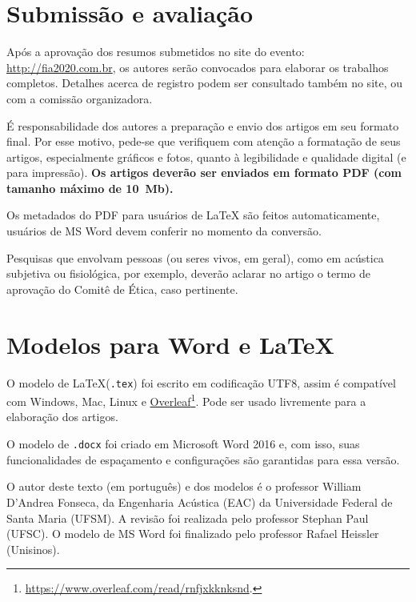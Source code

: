 \documentclass[12pt, a4paper, twoside, twocolumn]{article}
\begin{document}
\section{Submissão e avaliação}

Após a aprovação dos resumos submetidos no site do evento: \url{http://fia2020.com.br}, os autores serão convocados para elaborar os trabalhos completos.
Detalhes acerca de registro podem ser consultado também no site, ou com a comissão organizadora.

É responsabilidade dos autores a preparação e envio dos artigos em seu formato final. Por esse motivo, pede-se que verifiquem com atenção a formatação de seus artigos, especialmente gráficos e fotos, quanto à legibilidade e qualidade digital (e para impressão). \textbf{Os artigos deverão ser enviados em formato PDF (com tamanho máximo de 10~Mb).} 

Os metadados do PDF para usuários de \LaTeX\xspace são feitos automaticamente, usuários de MS Word devem conferir no momento da conversão.


Pesquisas que envolvam pessoas (ou seres vivos, em geral), como em acústica subjetiva ou fisiológica, por exemplo, deverão aclarar no artigo o termo de aprovação do Comitê de Ética, caso pertinente.

\section{Modelos para Word e \LaTeX}

O modelo de \LaTeX\xspace (\texttt{.tex}) foi escrito em codificação UTF8, assim é compatível com Windows, Mac, Linux e \href{https://www.overleaf.com/read/rnfjxkknksnd}{Overleaf}\footnote{\url{https://www.overleaf.com/read/rnfjxkknksnd}.}. Pode ser usado livremente para a elaboração dos artigos.

O modelo de \texttt{.docx} foi criado em Microsoft Word 2016 e, com isso, suas funcionalidades de espaçamento e configurações são garantidas para essa versão.

O autor deste texto (em português) e dos modelos é o professor William D'Andrea Fonseca, da Engenharia Acústica (EAC) da Universidade Federal de Santa Maria (UFSM).\linebreak
A revisão foi realizada pelo professor {Stephan Paul} (UFSC).
O modelo de MS Word foi finalizado pelo professor Rafael Heissler (Unisinos).
\end{document}
